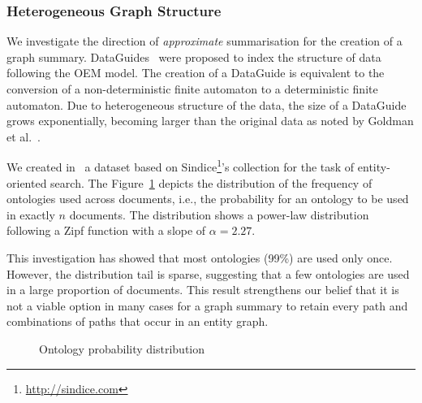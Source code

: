 \subsubsection{Heterogeneous Graph Structure}

We investigate the direction of \emph{approximate} summarisation for the creation of a graph summary. DataGuides~\cite{goldman1997dataguides} were proposed to index the structure of data following the OEM model.
The creation of a DataGuide is equivalent to the conversion of a non-deterministic finite automaton to a deterministic finite automaton.
Due to heterogeneous structure of the data, the size of a DataGuide grows exponentially, becoming larger than the original data as noted by Goldman et al.~\cite{goldman1999approximate}.

We created in~\cite{campinas:2011:eos} a dataset based on Sindice\footnote{\url{http://sindice.com}}'s collection for the task of entity-oriented search. The Figure~\ref{fig:onto-dist} depicts the distribution of the frequency of ontologies used across documents, i.e., the probability for an ontology to be used in exactly $n$ documents. The distribution shows a power-law distribution following a Zipf function with a slope of $\alpha = 2.27$.

This investigation has showed that most ontologies (99\%) are used only once. However, the distribution tail is sparse, suggesting that a few ontologies are used in a large proportion of documents.
This result strengthens our belief that it is not a viable option in many cases for a graph summary to retain every path and combinations of paths that occur in an entity graph.

\begin{figure}
	\centering
	
	\caption{Ontology probability distribution}
	\label{fig:onto-dist}
\end{figure}


